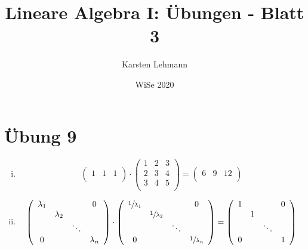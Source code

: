 \documentclass{article}
\author{Karsten Lehmann}
\date{WiSe 2020}
\title{Lineare Algebra I: Übungen - Blatt 3}
\begin{document}
\maketitle

\vfill

\newpage
\section*{Übung 9}

\begin{enumerate}[(i)]
\item
  \[
    \left(
      \begin{array}{ccc}
        1 & 1 & 1 \\
      \end{array}
    \right)
    \cdot
    \left(
      \begin{array}{ccc}
        1 & 2 & 3 \\
        2 & 3 & 4 \\
        3 & 4 & 5 \\
      \end{array}
    \right)
    =
    \left(
      \begin{array}{ccc}
        6 & 9 & 12 \\
      \end{array}
    \right)
  \]
\item
  \[
    \left(
      \begin{array}{cccc}
        \lambda_1 &           &        & 0 \\
                  & \lambda_2 \\
                  &           & \ddots \\
        0         &           &        & \lambda_n \\
      \end{array}
    \right)
    \cdot
    \left(
      \begin{array}{cccc}
        \sfrac{1}{\lambda_1} &                      &        & 0 \\
                             & \sfrac{1}{\lambda_2} \\
                             &                      & \ddots \\
        0                    &                      &        & \sfrac{1}{\lambda_n} \\
      \end{array}
    \right)
    =
    \left(
      \begin{array}{cccc}
        1 &   &        & 0 \\
          & 1 &        &   \\
          &   & \ddots &   \\
        0 &   &        & 1 \\
      \end{array}
    \right)
  \]


\end{enumerate}
\end{document}
